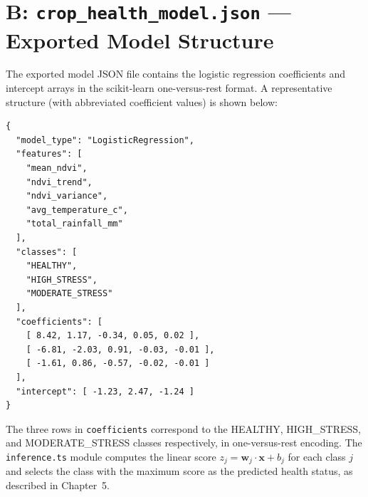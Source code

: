 \documentclass[12pt,a4paper]{report}
\begin{document}
\section*{B: \texttt{crop\_health\_model.json} — Exported Model Structure}

The exported model JSON file contains the logistic regression coefficients and intercept arrays in the scikit-learn one-versus-rest format. A representative structure (with abbreviated coefficient values) is shown below:

\begin{lstlisting}[caption={crop\_health\_model.json -- Exported Logistic Regression Weights (abbreviated)}, label={lst:model_json}]
{
  "model_type": "LogisticRegression",
  "features": [
    "mean_ndvi",
    "ndvi_trend",
    "ndvi_variance",
    "avg_temperature_c",
    "total_rainfall_mm"
  ],
  "classes": [
    "HEALTHY",
    "HIGH_STRESS",
    "MODERATE_STRESS"
  ],
  "coefficients": [
    [ 8.42, 1.17, -0.34, 0.05, 0.02 ],
    [ -6.81, -2.03, 0.91, -0.03, -0.01 ],
    [ -1.61, 0.86, -0.57, -0.02, -0.01 ]
  ],
  "intercept": [ -1.23, 2.47, -1.24 ]
}
\end{lstlisting}

\noindent The three rows in \texttt{coefficients} correspond to the HEALTHY, HIGH\_STRESS, and MODERATE\_STRESS classes respectively, in one-versus-rest encoding. The \texttt{inference.ts} module computes the linear score $z_j = \mathbf{w}_j \cdot \mathbf{x} + b_j$ for each class $j$ and selects the class with the maximum score as the predicted health status, as described in Chapter~5.
\end{document}

